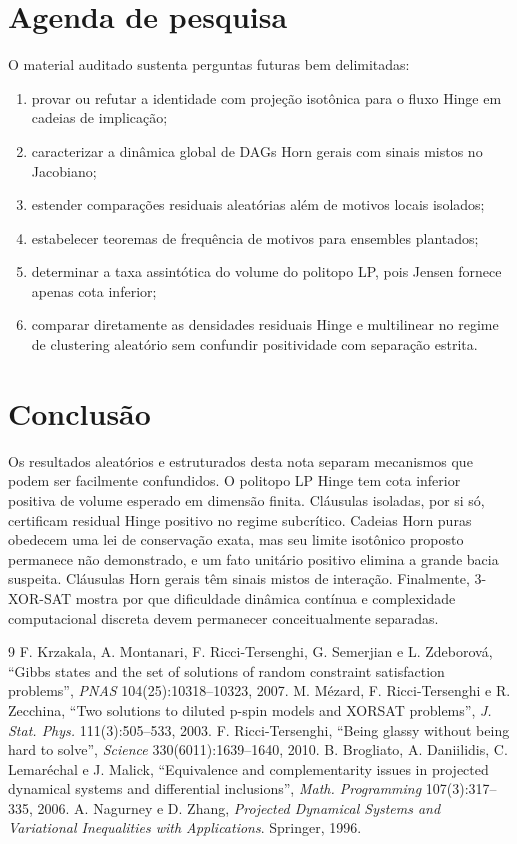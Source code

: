 \documentclass[11pt,a4paper]{article}
\begin{document}
\section{Agenda de pesquisa}
O material auditado sustenta perguntas futuras bem delimitadas:
\begin{enumerate}
\item provar ou refutar a identidade com projeção isotônica para o fluxo Hinge em cadeias de implicação;
\item caracterizar a dinâmica global de DAGs Horn gerais com sinais mistos no Jacobiano;
\item estender comparações residuais aleatórias além de motivos locais isolados;
\item estabelecer teoremas de frequência de motivos para ensembles plantados;
\item determinar a taxa assintótica do volume do politopo LP, pois Jensen fornece apenas cota inferior;
\item comparar diretamente as densidades residuais Hinge e multilinear no regime de clustering aleatório sem confundir positividade com separação estrita.
\end{enumerate}

\section{Conclusão}
Os resultados aleatórios e estruturados desta nota separam mecanismos que podem ser facilmente confundidos. O politopo LP Hinge tem cota inferior positiva de volume esperado em dimensão finita. Cláusulas isoladas, por si só, certificam residual Hinge positivo no regime subcrítico. Cadeias Horn puras obedecem uma lei de conservação exata, mas seu limite isotônico proposto permanece não demonstrado, e um fato unitário positivo elimina a grande bacia suspeita. Cláusulas Horn gerais têm sinais mistos de interação. Finalmente, 3-XOR-SAT mostra por que dificuldade dinâmica contínua e complexidade computacional discreta devem permanecer conceitualmente separadas.

\begin{thebibliography}{9}
 F. Krzakala, A. Montanari, F. Ricci-Tersenghi, G. Semerjian e L. Zdeborová, ``Gibbs states and the set of solutions of random constraint satisfaction problems'', \emph{PNAS} 104(25):10318--10323, 2007.
 M. Mézard, F. Ricci-Tersenghi e R. Zecchina, ``Two solutions to diluted p-spin models and XORSAT problems'', \emph{J. Stat. Phys.} 111(3):505--533, 2003.
 F. Ricci-Tersenghi, ``Being glassy without being hard to solve'', \emph{Science} 330(6011):1639--1640, 2010.
 B. Brogliato, A. Daniilidis, C. Lemaréchal e J. Malick, ``Equivalence and complementarity issues in projected dynamical systems and differential inclusions'', \emph{Math. Programming} 107(3):317--335, 2006.
 A. Nagurney e D. Zhang, \emph{Projected Dynamical Systems and Variational Inequalities with Applications}. Springer, 1996.
\end{thebibliography}
\end{document}

